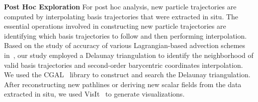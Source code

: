 \textbf{Post Hoc Exploration}
For post hoc analysis, new particle trajectories are computed by interpolating basis trajectories that were extracted in situ.
%
The essential operations involved in constructing new particle trajectories are identifying which basis trajectories to follow and then performing interpolation.
%
Based on the study of accuracy of various Lagrangian-based advection schemes in~\cite{agranovsky2015subsampling}, our study employed a Delaunay triangulation to identify the neighborhood of valid basis trajectories and second-order barycentric coordinates interpolation.
%
We used the CGAL~\cite{fabri2011cgal} library to construct and search the Delaunay triangulation.
%
After reconstructing new pathlines or deriving new scalar fields from the data extracted in situ, we used VisIt~\cite{childs2012visit} to generate visualizations.
%
